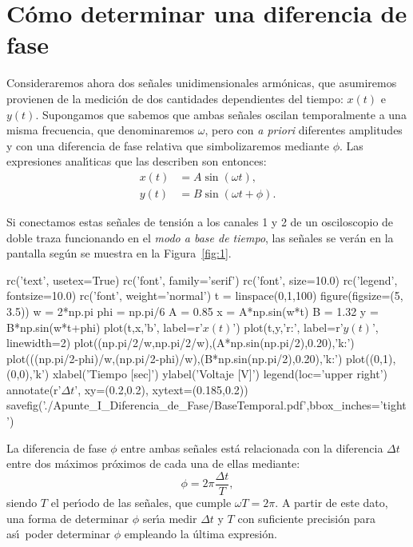 \documentclass[laboratorio]{guia}
\begin{document}
 
\maketitle

\section{C\'omo determinar una diferencia de fase}

Consideraremos ahora dos se\~nales unidimensionales arm\'onicas, que asumiremos
provienen de la medici\'on de dos cantidades dependientes del tiempo: $x(t)$ e
$y(t)$. Supongamos que sabemos que ambas se\~nales oscilan temporalmente a una
misma frecuencia, que denominaremos $\omega$, pero con {\it a priori}
diferentes amplitudes y con una diferencia de fase relativa que simbolizaremos
mediante $\phi$. Las expresiones anal\'\i ticas que las describen son entonces:
\begin{align}
    x(t) &= A \sin \left(\omega t\right), \\
    y(t) &= B \sin \left(\omega t + \phi \right).
\end{align}

Si conectamos estas se\~nales de tensi\'on a los canales 1 y 2 de un osciloscopio de doble
traza funcionando en el {\it modo a base de tiempo}, las se\~nales se ver\'an
en la pantalla seg\'un se muestra en la Figura~\ref{fig:1}. 


\begin{pylabcode}
rc('text', usetex=True)
rc('font', family='serif')
rc('font', size=10.0)
rc('legend', fontsize=10.0)
rc('font', weight='normal')
t = linspace(0,1,100)
figure(figsize=(5, 3.5))
w = 2*np.pi
phi = np.pi/6
A = 0.85
x = A*np.sin(w*t)
B = 1.32
y = B*np.sin(w*t+phi)
plot(t,x,'b', label=r'$x(t)$')
plot(t,y,'r:', label=r'$y(t)$', linewidth=2)
plot((np.pi/2/w,np.pi/2/w),(A*np.sin(np.pi/2),0.20),'k:')
plot(((np.pi/2-phi)/w,(np.pi/2-phi)/w),(B*np.sin(np.pi/2),0.20),'k:')
plot((0,1),(0,0),'k')
xlabel('Tiempo [sec]')
ylabel('Voltaje [V]')
legend(loc='upper right')
annotate(r'$\Delta t$', xy=(0.2,0.2), xytext=(0.185,0.2)) 
savefig('./Apunte_I_Diferencia_de_Fase/BaseTemporal.pdf',bbox_inches='tight')
\end{pylabcode}

La diferencia de fase $\phi$ entre ambas se\~nales est\'a relacionada con la
diferencia $\Delta t$ entre dos m\'aximos pr\'oximos de cada una de ellas
mediante:
\begin{equation}
    \phi = 2\pi \frac{\Delta t}{T},
\end{equation}
siendo $T$ el per\'\i odo de las se\~nales, que cumple $\omega T = 2\pi$. A
partir de este dato, una forma de determinar $\phi$ ser\'\i a medir $\Delta t$
y $T$ con suficiente precisi\'on para as\'\i\  poder determinar $\phi$
empleando la \'ultima expresi\'on. 
\end{document}
